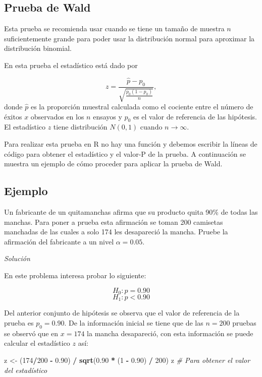 \documentclass[10pt,]{krantz}
\makeatletter
\newenvironment{Shaded}{\begin{snugshade}}{\end{snugshade}}
\newcommand{\KeywordTok}[1]{\textcolor[rgb]{0.13,0.29,0.53}{\textbf{#1}}}
\newcommand{\DecValTok}[1]{\textcolor[rgb]{0.00,0.00,0.81}{#1}}
\newcommand{\FloatTok}[1]{\textcolor[rgb]{0.00,0.00,0.81}{#1}}
\newcommand{\StringTok}[1]{\textcolor[rgb]{0.31,0.60,0.02}{#1}}
\newcommand{\CommentTok}[1]{\textcolor[rgb]{0.56,0.35,0.01}{\textit{#1}}}
\newcommand{\OperatorTok}[1]{\textcolor[rgb]{0.81,0.36,0.00}{\textbf{#1}}}
\newcommand{\NormalTok}[1]{#1}
\let\proglang=\textsf
\newenvironment{kframe}{%
\medskip{}
\setlength{\fboxsep}{.8em}
 \def\at@end@of@kframe{}%
 \ifinner\ifhmode%
  \def\at@end@of@kframe{\end{minipage}}%
  \begin{minipage}{\columnwidth}%
 \fi\fi%
 \def\FrameCommand##1{\hskip\@totalleftmargin \hskip-\fboxsep
 \colorbox{shadecolor}{##1}\hskip-\fboxsep
     \hskip-\linewidth \hskip-\@totalleftmargin \hskip\columnwidth}%
 \MakeFramed {\advance\hsize-\width
   \@totalleftmargin\z@ \linewidth\hsize
   \@setminipage}}%
 {\par\unskip\endMakeFramed%
 \at@end@of@kframe}
\renewenvironment{Shaded}{\begin{kframe}}{\end{kframe}}
\makeatother
\begin{document}
\subsection{Prueba de Wald}\label{prueba-de-wald}

Esta prueba se recomienda usar cuando se tiene un tamaño de muestra
\(n\) suficientemente grande para poder usar la distribución normal para
aproximar la distribución binomial.

En esta prueba el estadístico está dado por

\[z=\frac{\hat{p}-p_0}{\sqrt{\frac{p_0(1-p_0)}{n}}},\] donde \(\hat{p}\)
es la proporción muestral calculada como el cociente entre el número de
éxitos \(x\) observados en los \(n\) ensayos y \(p_0\) es el valor de
referencia de las hipótesis. El estadístico \(z\) tiene distribución
\(N(0, 1)\) cuando \(n \to \infty\).

Para realizar esta prueba en \proglang{R} no hay una función y debemos
escribir la líneas de código para obtener el estadístico y el valor-P de
la prueba. A continuación se muestra un ejemplo de cómo proceder para
aplicar la prueba de Wald.

\subsection*{Ejemplo}\label{ejemplo-64}


Un fabricante de un quitamanchas afirma que su producto quita 90\% de
todas las manchas. Para poner a prueba esta afirmación se toman 200
camisetas manchadas de las cuales a solo 174 les desapareció la mancha.
Pruebe la afirmación del fabricante a un nivel \(\alpha=0.05\).

\emph{Solución}

En este problema interesa probar lo siguiente:

\[H_0: p = 0.90\] \[H_1: p < 0.90\]

Del anterior conjunto de hipótesis se observa que el valor de referencia
de la prueba es \(p_0=0.90\). De la información inicial se tiene que de
las \(n=200\) pruebas se observó que en \(x=174\) la mancha desapareció,
con esta información se puede calcular el estadístico \(z\) así:

\begin{Shaded}
\begin{Highlighting}[]
\NormalTok{z <-}\StringTok{ }\NormalTok{(}\DecValTok{174}\OperatorTok{/}\DecValTok{200} \OperatorTok{-}\StringTok{ }\FloatTok{0.90}\NormalTok{) }\OperatorTok{/}\StringTok{ }\KeywordTok{sqrt}\NormalTok{(}\FloatTok{0.90} \OperatorTok{*}\StringTok{ }\NormalTok{(}\DecValTok{1} \OperatorTok{-}\StringTok{ }\FloatTok{0.90}\NormalTok{) }\OperatorTok{/}\StringTok{ }\DecValTok{200}\NormalTok{)}
\NormalTok{z  }\CommentTok{# Para obtener el valor del estadístico}
\end{Highlighting}
\end{Shaded}
\end{document}
